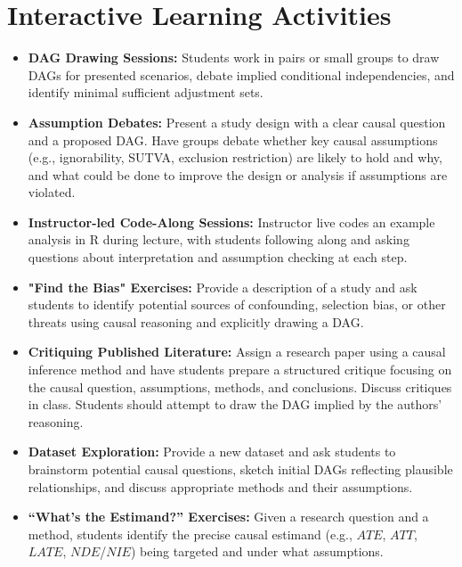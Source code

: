 \documentclass[10.5pt]{article}
\begin{document}
\section{Interactive Learning Activities}
\begin{itemize}
    \item \textbf{DAG Drawing Sessions:} Students work in pairs or small groups to draw DAGs for presented scenarios, debate implied conditional independencies, and identify minimal sufficient adjustment sets.
    \item \textbf{Assumption Debates:} Present a study design with a clear causal question and a proposed DAG. Have groups debate whether key causal assumptions (e.g., ignorability, SUTVA, exclusion restriction) are likely to hold and why, and what could be done to improve the design or analysis if assumptions are violated.
    \item \textbf{Instructor-led Code-Along Sessions:} Instructor live codes an example analysis in R during lecture, with students following along and asking questions about interpretation and assumption checking at each step.
    \item \textbf{"Find the Bias" Exercises:} Provide a description of a study and ask students to identify potential sources of confounding, selection bias, or other threats using causal reasoning and explicitly drawing a DAG.
    \item \textbf{Critiquing Published Literature:} Assign a research paper using a causal inference method and have students prepare a structured critique focusing on the causal question, assumptions, methods, and conclusions. Discuss critiques in class. Students should attempt to draw the DAG implied by the authors' reasoning.
    \item \textbf{Dataset Exploration:} Provide a new dataset and ask students to brainstorm potential causal questions, sketch initial DAGs reflecting plausible relationships, and discuss appropriate methods and their assumptions.
    \item \textbf{``What's the Estimand?'' Exercises:} Given a research question and a method, students identify the precise causal estimand (e.g., $ATE$, $ATT$, $LATE$, $NDE$/$NIE$) being targeted and under what assumptions.
\end{itemize}
\end{document}
